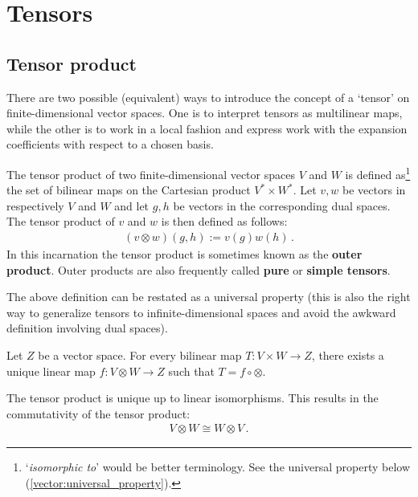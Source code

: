 \section{Tensors}\label{section:tensors}
\subsection{Tensor product}

    There are two possible (equivalent) ways to introduce the concept of a `tensor' on finite-dimensional vector spaces. One is to interpret tensors as multilinear maps, while the other is to work in a local fashion and express work with the expansion coefficients with respect to a chosen basis.

    \begin{definition}\label{vector:tensor_product}
        The tensor product of two finite-dimensional vector spaces $V$ and $W$ is defined as\footnote{`\textit{isomorphic to}' would be better terminology. See the universal property below (\cref{vector:universal_property}).} the set of bilinear maps on the Cartesian product $V^*\times W^*$. Let $v,w$ be vectors in respectively $V$ and $W$ and let $g,h$ be vectors in the corresponding dual spaces. The tensor product of $v$ and $w$ is then defined as follows:
        \begin{gather}
            (v\otimes w)(g,h) := v(g)w(h)\,.
        \end{gather}
        In this incarnation the tensor product is sometimes known as the \textbf{outer product}. Outer products are also frequently called \textbf{pure} or \textbf{simple tensors}.
    \end{definition}

    The above definition can be restated as a universal property (this is also the right way to generalize tensors to infinite-dimensional spaces and avoid the awkward definition involving dual spaces).
    \begin{uproperty}\label{vector:universal_property}
        Let $Z$ be a vector space. For every bilinear map $T:V\times W\rightarrow Z$, there exists a unique linear map $f:V\otimes W\rightarrow Z$ such that $T = f\circ\otimes$.
    \end{uproperty}
    \begin{result}
        The tensor product is unique up to linear isomorphisms. This results in the commutativity of the tensor product:
        \begin{gather}
           \label{vector:commutativity}
            V\otimes W \cong W\otimes V\,.
        \end{gather}
    \end{result}

